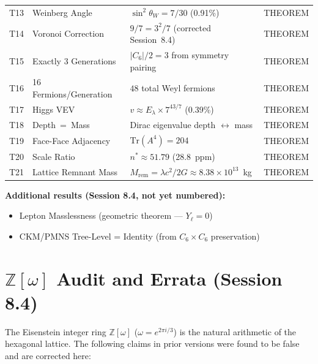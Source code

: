 \documentclass[11pt,letterpaper]{article}
\begin{document}
\begin{longtable}{clll}
T13 & Weinberg Angle               & $\sin^2\!\theta_W = 7/30$ (0.91\%) & THEOREM \\
T14 & Voronoi Correction           & $9/7 = 3^2/7$ (corrected Session~8.4) & THEOREM \\
T15 & Exactly 3 Generations        & $|C_6|/2 = 3$ from symmetry pairing & THEOREM \\
T16 & 16 Fermions/Generation       & $48$ total Weyl fermions & THEOREM \\
T17 & Higgs VEV                    & $v\approx E_\lambda\times7^{43/7}$ (0.39\%) & THEOREM \\
T18 & Depth~=~Mass                 & Dirac eigenvalue depth $\leftrightarrow$ mass & THEOREM \\
T19 & Face-Face Adjacency          & $\mathrm{Tr}(A^4) = 204$ & THEOREM \\
T20 & Scale Ratio                  & $n^*\approx51.79$ (28.8~ppm) & THEOREM \\
T21 & Lattice Remnant Mass         & $M_\mathrm{rem} = \lambda c^2/2G\approx8.38\times10^{13}$~kg & THEOREM \\
\bottomrule
\end{longtable}

\noindent\textbf{Additional results (Session 8.4, not yet numbered):}
\begin{itemize}[nosep]
  \item Lepton Masslessness (geometric theorem --- $Y_\ell = 0$)
  \item CKM/PMNS Tree-Level = Identity (from $C_6\times C_6$ preservation)
\end{itemize}

\section{$\mathbb{Z}[\omega]$ Audit and Errata (Session 8.4)}

The Eisenstein integer ring $\mathbb{Z}[\omega]$ ($\omega = e^{2\pi i/3}$)
is the natural arithmetic of the hexagonal lattice.  The following
claims in prior versions were found to be false and are corrected here:
\end{document}

